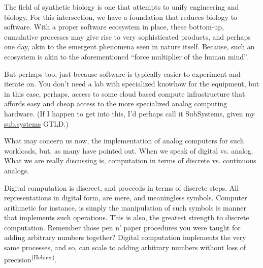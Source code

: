 


The field of synthetic biology is one that attempts to unify engineering and biology. For this intersection, we have a foundation that reduces biology to software. With a proper software ecosystem in place, these bottom-up, cumulative processes may give rise to very sophisticated products, and perhaps one day, akin to the emergent phenomena seen in nature itself. Because, such an ecosystem is akin to the aforementioned ``force multiplier of the human mind''.

But perhaps too, just because software is typically easier to experiment and iterate on. You don't need a lab with specialized knowhow for the equipment, but in this case, perhaps, access to some cloud based compute infrastructure that affords easy and cheap access to the more specialized analog computing hardware. (If I happen to get into this, I'd perhaps call it SubSystems, given my \url{sub.systems} GTLD.)

What may concern us now, the implementation of analog computers for such workloads, but, as many have pointed out. When we speak of digital vs. analog. What we are really discussing is, computation in terms of discrete vs. continuous analogs. 

Digital computation is discreet, and proceeds in terms of discrete steps. All representations in digital form, are mere, and meaningless symbols. Computer arithmetic for instance, is simply the manipulation of such symbols is manner that implements such operations. This is also, the greatest strength to discrete computation. Remember those pen n' paper procedures you were taught for adding arbitrary numbers together? Digital computation implements the very same processes, and so, can scale to adding arbitrary numbers without loss of precision\textsuperscript{(Hehner)}.


